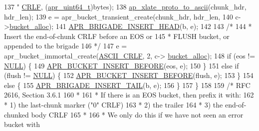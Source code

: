 \begin{DoxyCode}
137                                    \textcolor{stringliteral}{"%
      \hyperlink{group__APACHE__CORE__DAEMON_ga596f22107770abbd60ffce8338be9732}{CRLF}, (\hyperlink{group__apr__platform_ga722b277a42230f3fd41cb5be7a76cfb4}{apr\_uint64\_t})bytes);
138             \hyperlink{group__APACHE__CORE__EBCDIC_gab64dbae9ff27269fd9e52c43cb142c16}{ap\_xlate\_proto\_to\_ascii}(chunk\_hdr, hdr\_len);
139             e = apr\_bucket\_transient\_create(chunk\_hdr, hdr\_len,
140                                             c->\hyperlink{structconn__rec_a5a9ee4911c5a655131f76a04036fb4c0}{bucket\_alloc});
141             \hyperlink{group__APR__Util__Bucket__Brigades_ga6dc39d8757e18941a6fb069b0c18fbd3}{APR\_BRIGADE\_INSERT\_HEAD}(b, e);
142 
143             \textcolor{comment}{/*}
144 \textcolor{comment}{             * Insert the end-of-chunk CRLF before an EOS or}
145 \textcolor{comment}{             * FLUSH bucket, or appended to the brigade}
146 \textcolor{comment}{             */}
147             e = apr\_bucket\_immortal\_create(\hyperlink{chunk__filter_8c_a23f2c1c9e246a8db468e22fe13adb77a}{ASCII\_CRLF}, 2, c->
      \hyperlink{structconn__rec_a5a9ee4911c5a655131f76a04036fb4c0}{bucket\_alloc});
148             \textcolor{keywordflow}{if} (eos != \hyperlink{pcre_8txt_ad7f989d16aa8ca809a36bc392c07fba1}{NULL}) \{
149                 \hyperlink{group__APR__Util__Bucket__Brigades_gae012adeccda754eabc42b7855bec081e}{APR\_BUCKET\_INSERT\_BEFORE}(eos, e);
150             \}
151             \textcolor{keywordflow}{else} \textcolor{keywordflow}{if} (flush != \hyperlink{pcre_8txt_ad7f989d16aa8ca809a36bc392c07fba1}{NULL}) \{
152                 \hyperlink{group__APR__Util__Bucket__Brigades_gae012adeccda754eabc42b7855bec081e}{APR\_BUCKET\_INSERT\_BEFORE}(flush, e);
153             \}
154             \textcolor{keywordflow}{else} \{
155                 \hyperlink{group__APR__Util__Bucket__Brigades_ga5447595f8374296c5ffe208db39b2f5d}{APR\_BRIGADE\_INSERT\_TAIL}(b, e);
156             \}
157         \}
158 
159         \textcolor{comment}{/* RFC 2616, Section 3.6.1}
160 \textcolor{comment}{         *}
161 \textcolor{comment}{         * If there is an EOS bucket, then prefix it with:}
162 \textcolor{comment}{         *   1) the last-chunk marker ("0" CRLF)}
163 \textcolor{comment}{         *   2) the trailer}
164 \textcolor{comment}{         *   3) the end-of-chunked body CRLF}
165 \textcolor{comment}{         *}
166 \textcolor{comment}{         * We only do this if we have not seen an error bucket with}
}
\end{DoxyCode}
